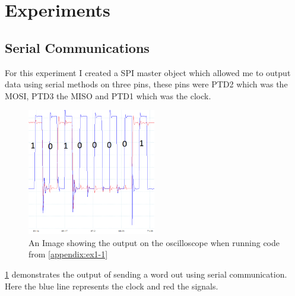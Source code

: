 \documentclass[a4paper,12pt]{scrartcl}
\begin{document}
	\section{Experiments}
	{
		\subsection{Serial Communications}
		{
			For this experiment I created a SPI master object which allowed me to output data using serial methods on three pins, these pins were PTD2 which was the MOSI, PTD3 the MISO and PTD1 which was the clock. 
			\begin{figure}[h]
				\centering
				\includegraphics[width=0.5\textwidth]{Ex1/Task1-Edited}
				\caption{An Image showing the output on the oscilloscope when running code from \cref{appendix:ex1-1}}
				\label{img:Ex1-Task1}
			\end{figure}
			\cref{img:Ex1-Task1} demonstrates the output of sending a word out using serial communication. Here the blue line represents the clock and red the signals.
			
}}
\end{document}
